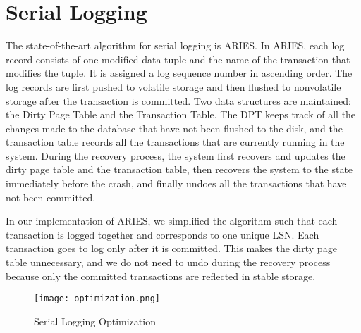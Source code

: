 \section{Serial Logging}

The state-of-the-art algorithm for serial logging is ARIES. In ARIES, each log record consists of one modified data tuple and the name of the transaction that modifies the tuple. It is assigned a log sequence number in ascending order. The log records are first pushed to volatile storage and then flushed to nonvolatile storage after the transaction is committed. Two data structures are maintained: the Dirty Page Table and the Transaction Table. The DPT keeps track of all the changes made to the database that have not been flushed to the disk, and the transaction table records all the transactions that are currently running in the system. During the recovery process, the system first recovers and updates the dirty page table and the transaction table, then recovers the system to the state immediately before the crash, and finally undoes all the transactions that have not been committed.



In our implementation of ARIES, we simplified the algorithm such that each transaction is logged together and corresponds to one unique LSN. Each transaction goes to log only after it is committed. This makes the dirty page table unnecessary, and we do not need to undo during the recovery process because only the committed transactions are reflected in stable storage.


\begin{figure}[!h]
  \texttt{[image: optimization.png]}
  \caption{Serial Logging Optimization}
  \label{optimization}
\end{figure}\\
